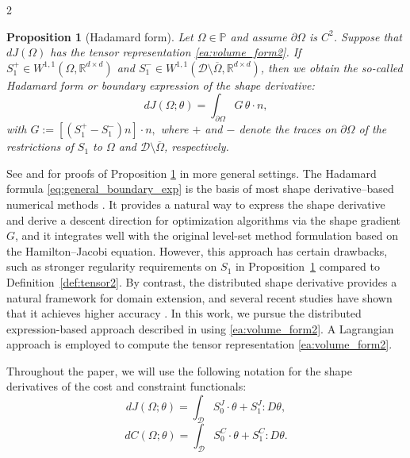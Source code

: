 \documentclass[a4paper, oneside]{article}
\newcommand{\hold}{\mathcal{D}}
\newcommand{\Sb}{S}
\newcommand{\Om}{\Omega}
\newcommand{\VV}{\theta}
\newcommand{\R}{\mathds{R}}
\newcommand{\tred}{\textcolor{red}}
\newtheorem{proposition}{Proposition}
\begin{document}
\begin{multicols}{2}
	\begin{proposition}[Hadamard form]\label{tensor_relations}
	Let $\Om\in \mathds{P}$ and assume $\partial \Omega$ is $C^2$. 
	Suppose that $dJ(\Omega)$ has the tensor representation \eqref{ea:volume_form2}.
	If $\Sb_1^+\in W^{1,1}(\Om,\R^{d\times d})$ and $\Sb_1^-\in W^{1,1}(\hold\setminus\overline \Omega,\R^{d\times d})$, 	then we obtain the so-called {\it Hadamard form} or {\it boundary expression} of the shape derivative: 
	\begin{equation}
	\label{eq:general_boundary_exp}
	dJ(\Omega;\theta) = \int_{\partial \Omega} G\, \theta\cdot n,
	\end{equation}
	with
	$
	G :=  [(\Sb_1^+-\Sb_1^-)n]\cdot n,
	$
	where $+$ and $-$ denote the traces on $\partial\Om$ of the restrictions of $\Sb_1$ to $\Omega$ and $\hold\setminus\overline \Omega$, respectively. 
	\end{proposition}
	See \cite[Proposition~1]{LAURAIN2020328} and \cite[Proposition~4.3]{MR3535238} for proofs of Proposition \ref{tensor_relations} in more general settings.
	The Hadamard formula \eqref{eq:general_boundary_exp} is the basis of most shape derivative–based numerical methods \cite{MR2252743,MR2033390,vanDijk2013}. It provides a natural way to express the shape derivative and derive a descent direction for optimization algorithms via the shape gradient $G$, and it integrates well with the original level-set method formulation \cite{MR965860} based on the Hamilton–Jacobi equation.
	However, this approach has certain drawbacks, such as stronger regularity requirements on $\Sb_1$ in Proposition~\ref{tensor_relations} compared to Definition~\ref{def:tensor2}. 
	By contrast, the distributed shape derivative provides a natural framework for domain extension, and several recent studies have shown that it achieves higher accuracy \cite{MR2642680,MR3348199}.
In this work, we pursue the distributed expression-based approach described in \cite{MR3843884} using \eqref{ea:volume_form2}.
	A Lagrangian approach is employed to compute the tensor representation \eqref{ea:volume_form2}.
	
Throughout the paper, we will use the following notation for the shape derivatives of the cost and constraint functionals:
	\begin{equation}\label{dJ1}
		dJ(\Omega;\VV) = \int_{\mathcal{D}} S_0^J \cdot \theta + S_1^J : D\theta, 
	\end{equation}
	\begin{equation}\label{dC1}
		dC(\Omega;\VV) = \int_{\mathcal{D}} S_0^C \cdot \theta + S_1^C : D\theta .
	\end{equation}


\end{multicols}
\end{document}
